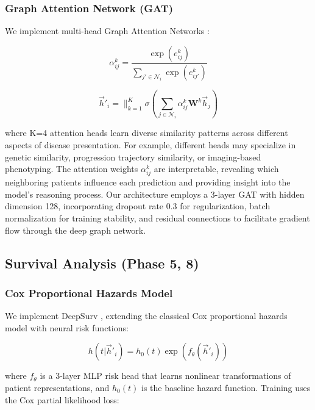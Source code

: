\documentclass[journal,twoside,web]{ieeecolor}
\begin{document}
\subsubsection{Graph Attention Network (GAT)}
We implement multi-head Graph Attention Networks \cite{velickovic2018graph}:

\begin{equation}
\alpha_{ij}^k = \frac{\exp(e_{ij}^k)}{\sum_{j' \in \mathcal{N}_i} \exp(e_{ij'}^k)}
\end{equation}

\begin{equation}
\vec{h}'_i = \|_{k=1}^K \sigma\left(\sum_{j \in \mathcal{N}_i} \alpha_{ij}^k \mathbf{W}^k\vec{h}_j\right)
\end{equation}

where K=4 attention heads learn diverse similarity patterns across different aspects of disease presentation. For example, different heads may specialize in genetic similarity, progression trajectory similarity, or imaging-based phenotyping. The attention weights $\alpha_{ij}^k$ are interpretable, revealing which neighboring patients influence each prediction and providing insight into the model's reasoning process. Our architecture employs a 3-layer GAT with hidden dimension 128, incorporating dropout rate 0.3 for regularization, batch normalization for training stability, and residual connections to facilitate gradient flow through the deep graph network.

\subsection{Survival Analysis (Phase 5, 8)}

\subsubsection{Cox Proportional Hazards Model}
We implement DeepSurv \cite{katzman2018deepsurv}, extending the classical Cox proportional hazards model with neural risk functions:

\begin{equation}
h(t|\vec{h}'_i) = h_0(t) \exp(f_\theta(\vec{h}'_i))
\end{equation}

where $f_\theta$ is a 3-layer MLP risk head that learns nonlinear transformations of patient representations, and $h_0(t)$ is the baseline hazard function. Training uses the Cox partial likelihood loss:
\end{document}
